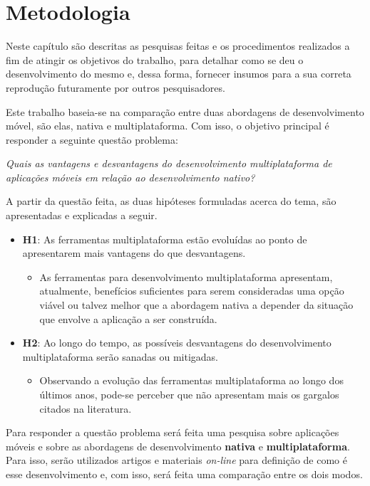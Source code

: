 \chapter{Metodologia} \label{cap:metodologia}
Neste capítulo são descritas as pesquisas feitas e os procedimentos realizados a 
fim de atingir os objetivos do trabalho, para detalhar como se deu o desenvolvimento do mesmo e, 
dessa forma, fornecer insumos para a sua correta reprodução futuramente por outros pesquisadores.

Este trabalho baseia-se na comparação entre duas abordagens de desenvolvimento móvel, são elas, nativa e multiplataforma. 
Com isso, o objetivo principal é responder a seguinte questão problema:
\begin{center}
    \textit{Quais as vantagens e desvantagens do desenvolvimento multiplataforma de aplicações móveis em relação ao desenvolvimento nativo?}
\end{center}

A partir da questão feita, as duas hipóteses formuladas acerca do tema, são apresentadas e explicadas a seguir.

\begin{itemize}
    \item \textbf{H1}: As ferramentas multiplataforma estão evoluídas ao ponto de apresentarem mais vantagens do que desvantagens.
        \begin{itemize}
            \item As ferramentas para desenvolvimento multiplataforma apresentam, atualmente, benefícios suficientes para serem consideradas uma opção viável ou talvez melhor que a abordagem nativa
            a depender da situação que envolve a aplicação a ser construída. 
        \end{itemize}
    \item \textbf{H2}: Ao longo do tempo, as possíveis desvantagens do desenvolvimento multiplataforma serão sanadas ou mitigadas.
        \begin{itemize}
            \item Observando a evolução das ferramentas multiplataforma ao longo dos últimos anos, pode-se perceber que não apresentam mais os gargalos citados na literatura.
        \end{itemize}
\end{itemize}

Para responder a questão problema será feita uma pesquisa sobre aplicações móveis e sobre as abordagens de desenvolvimento \textbf{nativa} e \textbf{multiplataforma}.
Para isso, serão utilizados artigos e materiais \textit{on-line} para definição de como é esse desenvolvimento e, com isso, será feita uma comparação entre os dois modos. 

